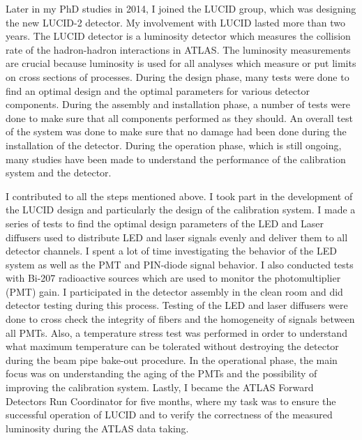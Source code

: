 \begin{preface}
Later in my PhD studies in 2014, I joined the LUCID group, which was designing the new LUCID-2 detector. My involvement with LUCID lasted more than two years. The LUCID detector is a luminosity detector which measures the collision rate of the hadron-hadron interactions in ATLAS. The luminosity measurements are crucial because luminosity is used for all analyses which measure or put limits on cross sections of processes.
During the design phase, many tests were done to find an optimal design and the optimal parameters for various detector components.
During the assembly and installation phase, a number of tests were done to make sure that all components performed as they should.
An overall test of the system was done to make sure that no damage had been done during the installation of the detector.
During the operation phase, which is still ongoing, many studies have been made to understand the performance of the calibration system and the detector.

I contributed to all the steps mentioned above. I took part in the development of the LUCID design and particularly the design of the calibration system. 
I made a series of tests to find the optimal design parameters of the LED and Laser diffusers used to distribute LED and laser signals evenly and deliver them to all 
detector channels. 
I spent a lot of time investigating the behavior of the LED system as well as the PMT and PIN-diode signal behavior.
I also conducted tests with Bi-207 radioactive sources which are used to monitor the photomultiplier (PMT) gain.
I participated in the detector assembly in the clean room and did detector testing during this process.
Testing of the LED and laser diffusers were done to cross check the integrity of fibers and the homogeneity of signals between all PMTs.
Also, a temperature stress test was performed in order to understand what maximum temperature can be tolerated without destroying the detector during the 
beam pipe bake-out procedure.
In the operational phase, the main focus was on understanding the aging of the PMTs and the possibility of improving the calibration system.
Lastly, I became the ATLAS Forward Detectors Run Coordinator for five months, where my task was to ensure the successful operation of LUCID and to verify the correctness of the measured luminosity during the ATLAS data taking.



\end{preface}
